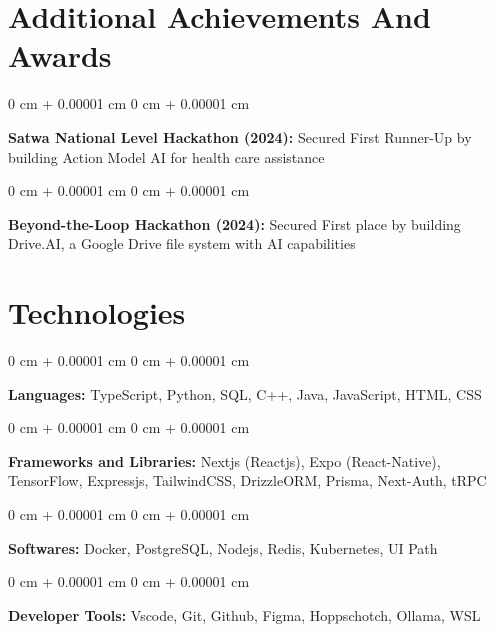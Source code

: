 \documentclass[10pt, letterpaper]{article}
\newenvironment{onecolentry}{
    \begin{adjustwidth}{
        0 cm + 0.00001 cm
    }{
        0 cm + 0.00001 cm
    }
}{
    \end{adjustwidth}
} %
\begin{document}
\section{Additional Achievements And Awards}

\begin{onecolentry}
    \textbf{Satwa National Level Hackathon (2024):} Secured First Runner-Up by building Action Model AI for health care assistance
\end{onecolentry}

\vspace{0.2 cm}

\begin{onecolentry}
    \textbf{Beyond-the-Loop Hackathon (2024):} Secured First place by building Drive.AI, a Google Drive file system with AI capabilities
\end{onecolentry}

\section{Technologies}

\begin{onecolentry}
    \textbf{Languages:} TypeScript, Python, SQL, C++, Java, JavaScript, HTML, CSS
\end{onecolentry}

\vspace{0.2 cm}

\begin{onecolentry}
    \textbf{Frameworks and Libraries:} Nextjs (Reactjs), Expo (React-Native), TensorFlow, Expressjs, TailwindCSS, DrizzleORM, Prisma, Next-Auth, tRPC
\end{onecolentry}
\vspace{0.2 cm}

\begin{onecolentry}
    \textbf{Softwares:} Docker, PostgreSQL, Nodejs, Redis, Kubernetes, UI Path %
\end{onecolentry}
\vspace{0.2 cm}

\begin{onecolentry}
    \textbf{Developer Tools:} Vscode, Git, Github, Figma, Hoppschotch, Ollama, WSL
\end{onecolentry}
\end{document}
